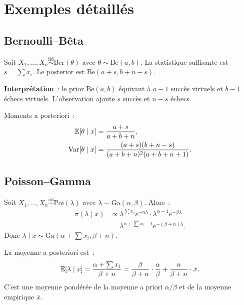 \section{Exemples d\'etaill\'es}

\subsection{Bernoulli--B\^eta}

\begin{exemple}
Soit $X_1, \ldots, X_n \overset{\text{iid}}{\sim} \text{Ber}(\theta)$
avec $\theta \sim \text{Be}(a, b)$. La statistique suffisante est
$s = \sum x_i$. Le posterior est $\text{Be}(a + s, b + n - s)$.

\textbf{Interpr\'etation}~: le prior $\text{Be}(a,b)$ \'equivaut \`a
$a - 1$ \og succ\`es \fg virtuels et $b - 1$ \og \'echecs \fg
virtuels. L'observation ajoute $s$ succ\`es et $n - s$ \'echecs.

Moments a posteriori~:
\begin{align*}
  \mathbb{E}[\theta \mid x] &= \frac{a + s}{a + b + n}, \\
  \mathrm{Var}[\theta \mid x] &= \frac{(a+s)(b+n-s)}{(a+b+n)^2(a+b+n+1)}.
\end{align*}
\end{exemple}

\subsection{Poisson--Gamma}

\begin{exemple}
Soit $X_1, \ldots, X_n \overset{\text{iid}}{\sim} \text{Poi}(\lambda)$
avec $\lambda \sim \text{Ga}(\alpha, \beta)$. Alors~:
\begin{align*}
  \pi(\lambda \mid x) &\propto
  \lambda^{\sum x_i} e^{-n\lambda} \cdot \lambda^{\alpha-1} e^{-\beta\lambda} \\
  &= \lambda^{\alpha + \sum x_i - 1} e^{-(\beta + n)\lambda}.
\end{align*}
Donc $\lambda \mid x \sim \text{Ga}(\alpha + \sum x_i, \beta + n)$.

La moyenne a posteriori est~:
\[
  \mathbb{E}[\lambda \mid x] = \frac{\alpha + \sum x_i}{\beta + n}
  = \frac{\beta}{\beta + n} \cdot \frac{\alpha}{\beta}
  + \frac{n}{\beta + n} \cdot \bar{x}.
\]
C'est une moyenne pond\'er\'ee de la moyenne a priori $\alpha/\beta$
et de la moyenne empirique $\bar{x}$.
\end{exemple}

